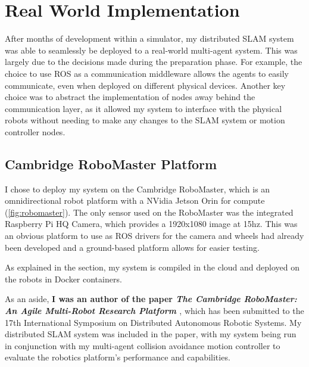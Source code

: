 \section{Real World Implementation}
\label{sec:real-world-implementation}
After months of development within a simulator, my distributed SLAM system was able to seamlessly be deployed to a real-world multi-agent system. This was largely due to the decisions made during the preparation phase. For example, the choice to use ROS as a communication middleware allows the agents to easily communicate, even when deployed on different physical devices. Another key choice was to abstract the implementation of nodes away behind the communication layer, as it allowed my system to interface with the physical robots without needing to make any changes to the SLAM system or motion controller nodes.

\subsection{Cambridge RoboMaster Platform}
\label{sec:cambridge-robomaster-platform}
I chose to deploy my system on the Cambridge RoboMaster, which is an omnidirectional robot platform with a NVidia Jetson Orin for compute (\autoref{fig:robomaster}). The only sensor used on the RoboMaster was the integrated Raspberry Pi HQ Camera, which provides a 1920x1080 image at 15hz. This was an obvious platform to use as ROS drivers for the camera and wheels had already been developed and a ground-based platform allows for easier testing.

As explained in the  section, my system is compiled in the cloud and deployed on the robots in Docker containers.

As an aside, \textbf{I was an author of the paper \textit{The Cambridge RoboMaster: An Agile Multi-Robot Research Platform} \autocite{blumenkamp2024cambridge}}, which has been submitted to the 17th International Symposium on Distributed Autonomous Robotic Systems. My distributed SLAM system was included in the paper, with my system being run in conjunction with my multi-agent collision avoidance motion controller to evaluate the robotics platform's performance and capabilities.


